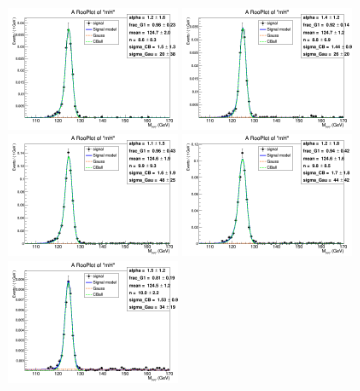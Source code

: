 \begin{figure}
	\begin{center}
		\includegraphics[width=0.40\textwidth]{fig/hmumu/2017/bkgfit_mu_ggF_1_125.png}
		\includegraphics[width=0.40\textwidth]{fig/hmumu/2017/bkgfit_mu_ggF_2_125.png}\\
		\includegraphics[width=0.40\textwidth]{fig/hmumu/2017/bkgfit_mu_ggF_3_125.png}
		\includegraphics[width=0.40\textwidth]{fig/hmumu/2017/bkgfit_mu_ggF_4_125.png}\\
		\includegraphics[width=0.40\textwidth]{fig/hmumu/2017/bkgfit_mu_VBF_501_125.png}

\end{center}
\end{figure}
